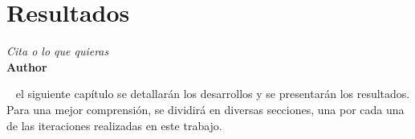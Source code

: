 \chapter{Resultados}

\vspace{-0.5cm}

\begin{flushright}
  \emph{\guillemotleft Cita o lo que quieras\guillemotright}\\ \textbf{Author}
\end{flushright}
\hyphenation{}
\grayMinitoc

\parindent=16mm

~ el siguiente capítulo se detallarán los desarrollos y se presentarán los resultados. Para una mejor comprensión, se dividirá en diversas secciones, una por cada una de las iteraciones realizadas en este trabajo.


